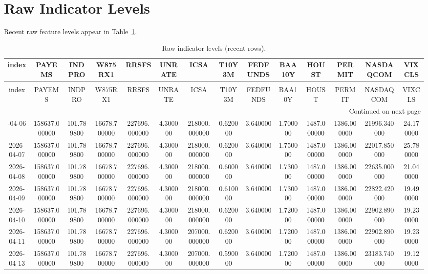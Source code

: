 \documentclass[conference,onecolumn]{IEEEtran}
\begin{document}
\section{Raw Indicator Levels}
Recent raw feature levels appear in Table~\ref{tab:raw}.
\begin{longtable}{|c|c|c|c|c|c|c|c|c|c|c|c|c|c|}
\caption{Raw indicator levels (recent rows).} \label{tab:raw} \\
\toprule
index & PAYEMS & INDPRO & W875RX1 & RRSFS & UNRATE & ICSA & T10Y3M & FEDFUNDS & BAA10Y & HOUST & PERMIT & NASDAQCOM & VIXCLS \\
\midrule
\endfirsthead
\caption[]{Raw indicator levels (recent rows).} \\
\toprule
index & PAYEMS & INDPRO & W875RX1 & RRSFS & UNRATE & ICSA & T10Y3M & FEDFUNDS & BAA10Y & HOUST & PERMIT & NASDAQCOM & VIXCLS \\
\midrule
\endhead
\midrule
\multicolumn{14}{r}{Continued on next page} \\
\midrule
\endfoot
\bottomrule
\endlastfoot
2026-04-06 & 158637.000000 & 101.789800 & 16678.700000 & 227696.000000 & 4.300000 & 218000.000000 & 0.620000 & 3.640000 & 1.700000 & 1487.000000 & 1386.000000 & 21996.340000 & 24.170000 \\
2026-04-07 & 158637.000000 & 101.789800 & 16678.700000 & 227696.000000 & 4.300000 & 218000.000000 & 0.620000 & 3.640000 & 1.750000 & 1487.000000 & 1386.000000 & 22017.850000 & 25.780000 \\
2026-04-08 & 158637.000000 & 101.789800 & 16678.700000 & 227696.000000 & 4.300000 & 218000.000000 & 0.600000 & 3.640000 & 1.730000 & 1487.000000 & 1386.000000 & 22635.000000 & 21.040000 \\
2026-04-09 & 158637.000000 & 101.789800 & 16678.700000 & 227696.000000 & 4.300000 & 218000.000000 & 0.610000 & 3.640000 & 1.730000 & 1487.000000 & 1386.000000 & 22822.420000 & 19.490000 \\
2026-04-10 & 158637.000000 & 101.789800 & 16678.700000 & 227696.000000 & 4.300000 & 218000.000000 & 0.620000 & 3.640000 & 1.720000 & 1487.000000 & 1386.000000 & 22902.890000 & 19.230000 \\
2026-04-11 & 158637.000000 & 101.789800 & 16678.700000 & 227696.000000 & 4.300000 & 207000.000000 & 0.620000 & 3.640000 & 1.720000 & 1487.000000 & 1386.000000 & 22902.890000 & 19.230000 \\
2026-04-13 & 158637.000000 & 101.789800 & 16678.700000 & 227696.000000 & 4.300000 & 207000.000000 & 0.590000 & 3.640000 & 1.720000 & 1487.000000 & 1386.000000 & 23183.740000 & 19.120000 \\

\end{longtable}
\end{document}
